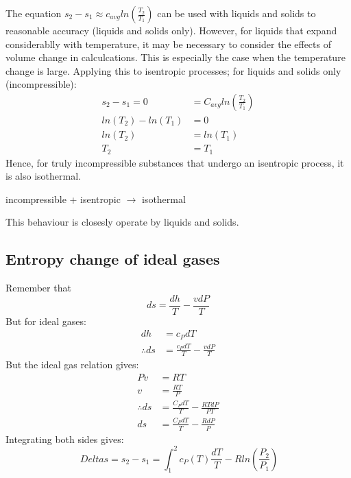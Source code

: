 \documentclass[class=report, crop=false, 12pt,a4paper]{standalone}
\numberwithin{equation}{section}
\begin{document}
The equation \( s_2 - s_1 \approx c_{avg} ln(\frac{T_2}{T_1}) \) can be used with liquids and solids to reasonable accuracy (liquids and solids only). However, for liquids that expand considerablly with temperature, it may be necessary to consider the effects of volume change in calculcations. This is especially the case when the temperature change is large. Applying this to isentropic processes; for liquids and solids only (incompressible):
\begin{align}
  s_2 - s_1 = 0 &= C_{avg} ln(\frac{T_2}{T_1})\\
  ln(T_2) - ln(T_1) &= 0 \\
  ln(T_2) &= ln(T_1)\\
  T_2 &= T_1
\end{align}
Hence, for truly incompressible substances that undergo an isentropic process, it is also isothermal.
\begin{center}
  incompressible + isentropic \(\rightarrow\) isothermal
\end{center}
This behaviour is closesly operate by liquids and solids. 
\subsection{Entropy change of ideal gases}
Remember that 
\begin{equation} 
  ds = \frac{dh}{T} - \frac{vdP}{T} 
\end{equation}
But for ideal gases:
\begin{align}
  dh &= c_P dT\\
  \therefore ds &= \frac{c_PdT}{T} - \frac{vdP}{T}
\end{align}
But the ideal gas relation gives:
\begin{align}
  Pv&=RT\\
  v&=\frac{RT}{P}\\
  \therefore ds &= \frac{C_PdT}{T} - \frac{RTdP}{PT}\\
  ds &= \frac{C_PdT}{T} - \frac{RdP}{P}
\end{align}
Integrating both sides gives:
\begin{equation} \
  Delta s = s_2 - s_1 = \int_1^2 c_P(T)\frac{dT}{T} - Rln\left(\frac{P_2}{P_1}\right) 
\end{equation}
\end{document}
